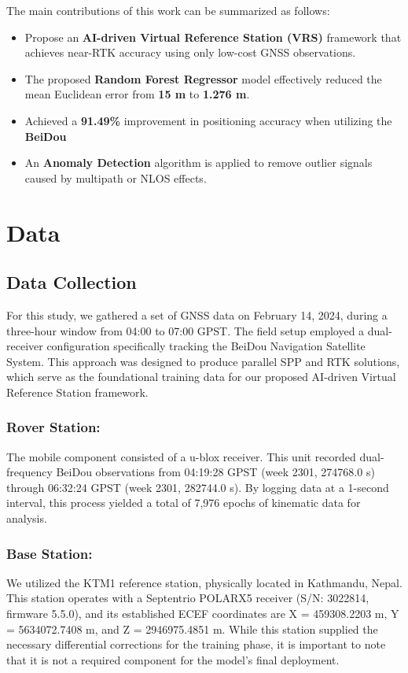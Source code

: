 \documentclass{isprs} %
\begin{document}
The main contributions of this work can be summarized as follows:
\begin{itemize}
    \item Propose an \textbf{AI-driven Virtual Reference Station (VRS) }framework that achieves near-RTK accuracy using only low-cost GNSS observations.
    \item The proposed \textbf{Random Forest Regressor} model effectively reduced the mean Euclidean error from \textbf{15 m} to \textbf{1.276 m}.
    \item Achieved a \textbf{91.49\%} improvement in positioning accuracy when utilizing the \textbf{BeiDou} \item An \textbf{Anomaly Detection} algorithm is applied to remove outlier signals caused by multipath or NLOS effects.
\end{itemize}

\section{Data}

\subsection{Data Collection}
For this study, we gathered a set of GNSS data on February 14, 2024, during a three-hour window from 04:00 to 07:00 GPST. The field setup employed a dual-receiver configuration specifically tracking the BeiDou Navigation Satellite System.  This approach was designed to produce parallel SPP and RTK solutions, which serve as the foundational training data for our proposed AI-driven Virtual Reference Station framework.

\subsubsection{Rover Station: }
The mobile component consisted of a u-blox receiver. This unit recorded dual-frequency BeiDou observations from 04:19:28 GPST (week 2301, 274768.0 s) through 06:32:24 GPST (week 2301, 282744.0 s). By logging data at a 1-second interval, this process yielded a total of 7,976 epochs of kinematic data for analysis.

\subsubsection{Base Station: }
We utilized the KTM1 reference station, physically located in Kathmandu, Nepal. This station operates with a Septentrio POLARX5 receiver (S/N: 3022814, firmware 5.5.0), and its established ECEF coordinates are X = 459308.2203 m, Y = 5634072.7408 m, and Z = 2946975.4851 m. While this station supplied the necessary differential corrections for the training phase, it is important to note that it is not a required component for the model's final deployment.
\end{document}
